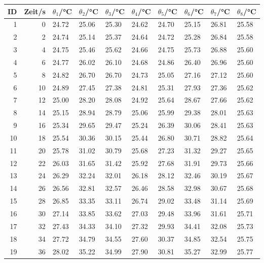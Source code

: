 \begin{longtable}{rrllllllll}
	\hline
	{ID}&{Zeit/\si{\second}} &{$\theta_{1}$/\si{\degreeCelsius}}&{$\theta_{2}$/\si{\degreeCelsius}}&{$\theta_{3}$/\si{\degreeCelsius}}&{$\theta_{4}$/\si{\degreeCelsius}}&{$\theta_{5}$/\si{\degreeCelsius}}&{$\theta_{6}$/\si{\degreeCelsius}}&{$\theta_{7}$/\si{\degreeCelsius}}&{$\theta_{8}$/\si{\degreeCelsius}}\\
	\hline
	\endhead
		1 & 0 & 24.72 & 25.06 & 25.30 & 24.62 & 24.70 & 25.15 & 26.81 & 25.58 \\ 
		2 & 2 & 24.74 & 25.14 & 25.37 & 24.64 & 24.72 & 25.28 & 26.84 & 25.58 \\ 
		3 & 4 & 24.75 & 25.46 & 25.62 & 24.66 & 24.75 & 25.73 & 26.88 & 25.60 \\ 
		4 & 6 & 24.77 & 26.02 & 26.10 & 24.68 & 24.86 & 26.40 & 26.96 & 25.60 \\ 
		5 & 8 & 24.82 & 26.70 & 26.70 & 24.73 & 25.05 & 27.16 & 27.12 & 25.60 \\ 
		6 & 10 & 24.89 & 27.45 & 27.38 & 24.81 & 25.31 & 27.93 & 27.36 & 25.62 \\ 
		7 & 12 & 25.00 & 28.20 & 28.08 & 24.92 & 25.64 & 28.67 & 27.66 & 25.62 \\ 
		8 & 14 & 25.15 & 28.94 & 28.79 & 25.06 & 25.99 & 29.38 & 28.01 & 25.63 \\ 
		9 & 16 & 25.34 & 29.65 & 29.47 & 25.24 & 26.39 & 30.06 & 28.41 & 25.63 \\ 
		10 & 18 & 25.54 & 30.36 & 30.15 & 25.44 & 26.80 & 30.71 & 28.82 & 25.64 \\ 
		11 & 20 & 25.78 & 31.02 & 30.79 & 25.68 & 27.23 & 31.32 & 29.27 & 25.65 \\ 
		12 & 22 & 26.03 & 31.65 & 31.42 & 25.92 & 27.68 & 31.91 & 29.73 & 25.66 \\ 
		13 & 24 & 26.29 & 32.24 & 32.01 & 26.18 & 28.12 & 32.46 & 30.19 & 25.67 \\ 
		14 & 26 & 26.56 & 32.81 & 32.57 & 26.46 & 28.58 & 32.98 & 30.67 & 25.68 \\ 
		15 & 28 & 26.85 & 33.35 & 33.11 & 26.74 & 29.02 & 33.48 & 31.14 & 25.69 \\ 
		16 & 30 & 27.14 & 33.85 & 33.62 & 27.03 & 29.48 & 33.96 & 31.61 & 25.71 \\ 
		17 & 32 & 27.43 & 34.33 & 34.10 & 27.32 & 29.93 & 34.41 & 32.08 & 25.73 \\ 
		18 & 34 & 27.72 & 34.79 & 34.55 & 27.60 & 30.37 & 34.85 & 32.54 & 25.75 \\ 
		19 & 36 & 28.02 & 35.22 & 34.99 & 27.90 & 30.81 & 35.27 & 32.99 & 25.77 \\ 

\end{longtable}
